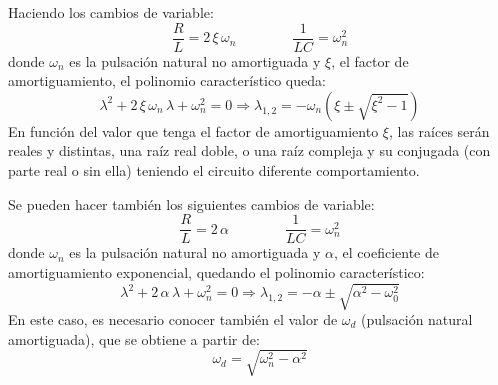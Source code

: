 Haciendo los cambios de variable:
\begin{equation*}
	    {\dfrac{R}{L}=2\,\xi\,\omega_n}\qquad \qquad {\dfrac{1}{LC}=\omega_n^2}
	\end{equation*}
	donde $\omega_n$ es la pulsación natural no amortiguada y $\xi$, el factor de amortiguamiento, el polinomio característico queda:
	\begin{equation*}
	    \lambda^2+2\,\xi\,\omega_n\,\lambda + \omega_n^2=0 \Rightarrow \lambda_{1,2}=-\omega_n\left(\xi\pm\sqrt{\xi^2-1}\right)
	\end{equation*}
	En función del valor que tenga el factor de amortiguamiento $\xi$, las raíces serán reales y distintas, una raíz real doble, o una raíz compleja y su conjugada (con parte real o sin ella) teniendo el circuito diferente comportamiento. 
	
	\begin{remark}
	Se pueden hacer también los siguientes cambios de variable: 
	\begin{equation*}
	    {\dfrac{R}{L}=2\,\alpha}\qquad \qquad {\dfrac{1}{LC}=\omega_n^2}
	\end{equation*}
	donde $\omega_n$ es la pulsación natural no amortiguada y $\alpha$, el coeficiente de amortiguamiento exponencial, quedando el polinomio característico: 
	\begin{equation*}
	    \lambda^2+2\,\alpha\,\lambda + \omega_n^2=0 \Rightarrow \lambda_{1,2}=-\alpha \pm \sqrt{\alpha^2 - \omega_0^2}
	\end{equation*}
	En este caso, es necesario conocer también el valor de $\omega_d$ (pulsación natural amortiguada), que se obtiene a partir de:
	\begin{equation*}
	    \omega_d=\sqrt{\omega_n^2-\alpha^2}
	\end{equation*}
	\end{remark}
	
